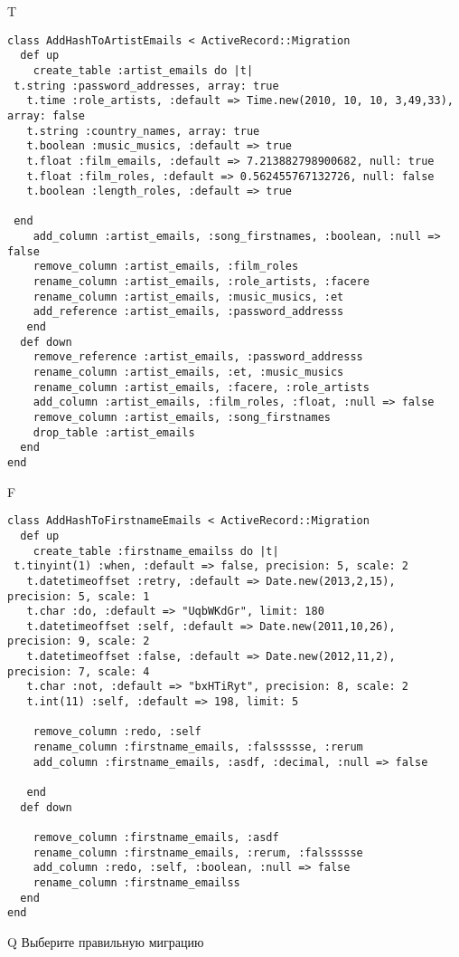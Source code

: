 T
\begin{verbatim}
class AddHashToArtistEmails < ActiveRecord::Migration
  def up
    create_table :artist_emails do |t|
 t.string :password_addresses, array: true
   t.time :role_artists, :default => Time.new(2010, 10, 10, 3,49,33), array: false
   t.string :country_names, array: true
   t.boolean :music_musics, :default => true
   t.float :film_emails, :default => 7.213882798900682, null: true
   t.float :film_roles, :default => 0.562455767132726, null: false
   t.boolean :length_roles, :default => true

 end
    add_column :artist_emails, :song_firstnames, :boolean, :null => false
    remove_column :artist_emails, :film_roles
    rename_column :artist_emails, :role_artists, :facere
    rename_column :artist_emails, :music_musics, :et
    add_reference :artist_emails, :password_addresss
   end
  def down
    remove_reference :artist_emails, :password_addresss
    rename_column :artist_emails, :et, :music_musics
    rename_column :artist_emails, :facere, :role_artists
    add_column :artist_emails, :film_roles, :float, :null => false
    remove_column :artist_emails, :song_firstnames
    drop_table :artist_emails
  end
end
\end{verbatim}

F
\begin{verbatim}
class AddHashToFirstnameEmails < ActiveRecord::Migration
  def up
    create_table :firstname_emailss do |t| 
 t.tinyint(1) :when, :default => false, precision: 5, scale: 2
   t.datetimeoffset :retry, :default => Date.new(2013,2,15), precision: 5, scale: 1
   t.char :do, :default => "UqbWKdGr", limit: 180
   t.datetimeoffset :self, :default => Date.new(2011,10,26), precision: 9, scale: 2
   t.datetimeoffset :false, :default => Date.new(2012,11,2), precision: 7, scale: 4
   t.char :not, :default => "bxHTiRyt", precision: 8, scale: 2
   t.int(11) :self, :default => 198, limit: 5

    remove_column :redo, :self
    rename_column :firstname_emails, :falssssse, :rerum
    add_column :firstname_emails, :asdf, :decimal, :null => false

   end
  def down

    remove_column :firstname_emails, :asdf
    rename_column :firstname_emails, :rerum, :falssssse
    add_column :redo, :self, :boolean, :null => false
    rename_column :firstname_emailss
  end
end
\end{verbatim}
Q
Выберите правильную миграцию

